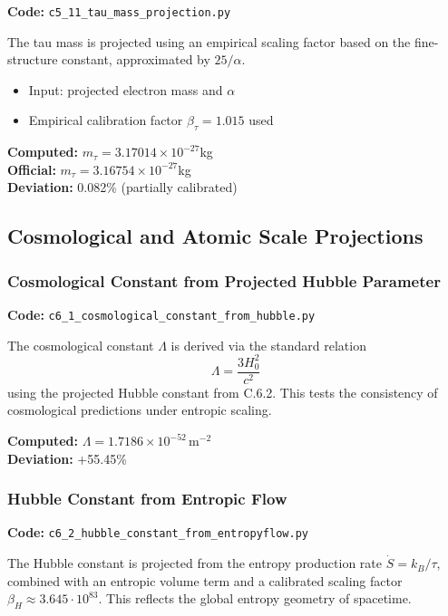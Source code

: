 \documentclass[10.5pt,a4paper]{article}
\begin{document}
\textbf{Code:} \texttt{c5\_11\_tau\_mass\_projection.py}

The tau mass is projected using an empirical scaling factor based on the fine-structure constant, approximated by \( 25 / \alpha \).

\begin{itemize}
    \item Input: projected electron mass and \(\alpha\)
    \item Empirical calibration factor \(\beta_\tau = 1.015\) used
\end{itemize}

\textbf{Computed:} \( m_\tau = 3.17014 \times 10^{-27} \)kg \\
\textbf{Official:} \( m_\tau = 3.16754 \times 10^{-27} \)kg \\
\textbf{Deviation:} 0.082\% (partially calibrated)

\subsection{Cosmological and Atomic Scale Projections}

\subsubsection{Cosmological Constant from Projected Hubble Parameter}

\textbf{Code:} \texttt{c6\_1\_cosmological\_constant\_from\_hubble.py}

The cosmological constant \(\Lambda\) is derived via the standard relation
\[
\Lambda = \frac{3 H_0^2}{c^2}
\]
using the projected Hubble constant from C.6.2. This tests the consistency of cosmological predictions under entropic scaling.

\textbf{Computed:} \(\Lambda = 1.7186 \times 10^{-52}\,\mathrm{m}^{-2}\) \\
\textbf{Deviation:} +55.45\%

\subsubsection{Hubble Constant from Entropic Flow}

\textbf{Code:} \texttt{c6\_2\_hubble\_constant\_from\_entropyflow.py}

The Hubble constant is projected from the entropy production rate \(\dot{S} = k_B / \tau\), combined with an entropic volume term and a calibrated scaling factor \(\beta_H \approx 3.645 \cdot 10^{83}\). This reflects the global entropy geometry of spacetime.
\end{document}
